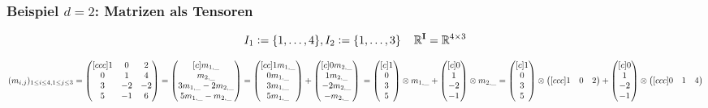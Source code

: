 \documentclass[11pt]{article} %
\begin{document}
\subsubsection{Beispiel $d=2$: Matrizen als Tensoren}
\begin{changemargin}{0pt}{0pt}

\[ I_{1} := \{1,\dots,4\}, I_{2} := \{1,\dots,3\} \hspace{4mm} \mathbb{R}^{\mathbf{I}} = \mathbb{R}^{4\times 3}\]

$
(m_{i,j})_{1 \leq i \leq 4, 1 \leq j \leq 3} =
\begin{pmatrix}[ccc]
  1 & 0 & 2 \\
  0 & 1 & 4 \\
  3 & -2 & -2 \\
  5 & -1 & 6
\end{pmatrix} =
\begin{pmatrix}[c]
  m_{1,\_} \\
  m_{2,\_} \\
  3m_{1,\_} -2m_{2,\_} \\
  5m_{1,\_} -m_{2,\_}
\end{pmatrix} =
\begin{pmatrix}[cc]
  1m_{1,\_} \\
  0m_{1,\_} \\
  3m_{1,\_} \\
  5m_{1,\_}
\end{pmatrix} +
\begin{pmatrix}[c]
  0m_{2,\_} \\
  1m_{2,\_} \\
  -2m_{2,\_} \\
  -m_{2,\_}
\end{pmatrix} \\
=
\begin{pmatrix}[c]
  1 \\
  0 \\
  3 \\
  5
\end{pmatrix} \otimes m_{1,\_} +
\begin{pmatrix}[c]
  0 \\
  1 \\
  -2 \\
  -1
\end{pmatrix} \otimes m_{2,\_} =
\begin{pmatrix}[c]
  1 \\
  0 \\
  3 \\
  5
\end{pmatrix} \otimes
\begin{pmatrix}[ccc]
  1 & 0 & 2 \\
\end{pmatrix} +
\begin{pmatrix}[c]
  0 \\
  1 \\
  -2 \\
  -1
\end{pmatrix} \otimes
\begin{pmatrix}[ccc]
  0 & 1 & 4
\end{pmatrix}
$


\end{changemargin}
\end{document}
